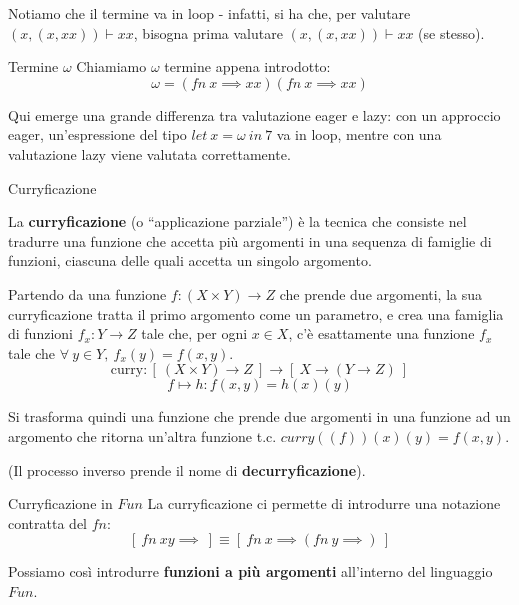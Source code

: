 \documentclass[a4paper,11pt]{report}
\begin{document}
Notiamo che il termine va in loop - infatti, si ha che, per valutare \((x, (x,xx))\vdash  xx \), bisogna prima valutare \((x, (x,xx))\vdash  xx \) (se stesso).

\begin{gbox}{Termine \( \omega \)}
    Chiamiamo \( \omega \) termine appena introdotto:
    \[ \omega =  (fn \ x \implies xx)(fn \ x \implies xx) \]

    
\end{gbox}

Qui emerge una grande differenza tra valutazione eager e lazy: con un approccio eager, un'espressione del tipo \( let \ x = \omega \ in \ 7 \) va in loop, mentre con una valutazione lazy viene valutata correttamente.


\begin{defbox}{Curryficazione}{}

    La \textbf{curryficazione} (o ``applicazione parziale'') è la tecnica che consiste nel tradurre una funzione che accetta più argomenti in una sequenza di famiglie di funzioni, ciascuna delle quali accetta un singolo argomento.


    Partendo da una funzione \( f: (X \times Y) \to Z\) che prende due argomenti, la sua curryficazione tratta il primo argomento come un parametro, e crea una famiglia di funzioni \( f_x : Y \to Z \) tale che, per ogni \( x \in X  \), c'è esattamente una funzione \( f_x \) tale che \( \forall \ y \in Y , \  f_x(y)=f(x,y)\).
    \[ \text{curry}: [ \ (X \times Y) \to Z \ ] \to [ \ X \to (Y \to Z) \ ]\]
    \[ f \mapsto h : f(x, y) = h(x)(y) \]


Si trasforma quindi una funzione che prende due argomenti in una funzione ad un argomento che ritorna un'altra funzione t.c. \( curry((f))(x)(y) = f(x, y) \).

(Il processo inverso prende il nome di \textbf{decurryficazione}).

\end{defbox}

\begin{gbox}[colback=DeepGreenLight, colframe=DeepGreen, colbacktitle=DeepGreen]{Curryficazione in \( Fun \)}
    La curryficazione ci permette di introdurre una notazione contratta del \( fn \):
    \[ [ \ fn \ x y \implies \ ] \equiv [ \ fn \ x \implies ( fn \ y \implies ) \ ]\]

    Possiamo così introdurre \textbf{funzioni a più argomenti} all'interno del linguaggio \( Fun \).

\end{gbox}
\end{document}
